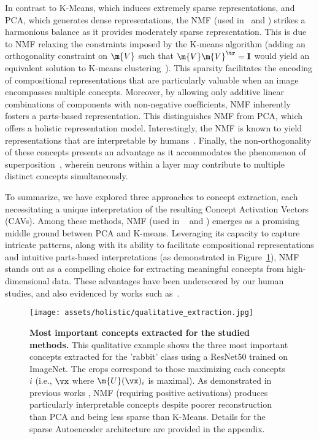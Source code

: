 In contrast to K-Means, which induces extremely sparse representations, and PCA, which generates dense representations, the NMF (used in \CRAFT~and \ICE) strikes a harmonious balance as it provides moderately sparse representation. This is due to NMF relaxing the constraints imposed by the K-means algorithm (adding an orthogonality constraint on $\m{V}$ such that $\m{V} \m{V}^\tr = \mathbf{I}$ would yield an equivalent solution to K-means clustering~\cite{ding2005equivalence}). This sparsity facilitates the encoding of compositional representations that are particularly valuable when an image encompasses multiple concepts. Moreover, by allowing only additive linear combinations of components with non-negative coefficients, %
NMF inherently fosters a parts-based representation. This distinguishes NMF from PCA, which offers a holistic representation model. Interestingly, the NMF is known to yield representations that are interpretable by humans~\cite{zhang2021invertible, fel2023craft}.
Finally, the non-orthogonality of these concepts presents an advantage as it accommodates the phenomenon of superposition~\cite{elhage2022superposition}, wherein neurons within a layer may contribute to multiple distinct concepts simultaneously.

To summarize, we have explored three approaches to concept extraction, each necessitating a unique interpretation of the resulting Concept Activation Vectors (CAVs). Among these methods, NMF (used in \CRAFT~ and \ICE) emerges as a promising middle ground between PCA and K-means. Leveraging its capacity to capture intricate patterns, along with its ability to facilitate compositional representations and intuitive parts-based interpretations (as demonstrated in Figure~\ref{fig:holistic:qualitative_comparison}), NMF stands out as a compelling choice for extracting meaningful concepts from high-dimensional data. These advantages have been underscored by our human studies, and also evidenced by works such as~\cite{zhang2021invertible}.



\begin{figure}[t]
\begin{center}
   \texttt{[image: assets/holistic/qualitative\_extraction.jpg]}
\end{center}
   \caption{\textbf{Most important concepts extracted for the studied methods.} This qualitative example shows the three most important concepts extracted for the 'rabbit' class using a ResNet50 trained on ImageNet. The crops correspond to those maximizing each concepts $i$ (i.e., $\vx$ where $\m{U}(\vx)_i$ is maximal). As demonstrated in previous works \cite{zhang2021invertible,fel2023craft,parekh2022listen}, NMF (requiring positive activations) produces particularly interpretable concepts despite poorer reconstruction than PCA and being less sparse than K-Means. Details for the sparse Autoencoder architecture are provided in the appendix.}
\label{fig:holistic:qualitative_comparison}
\end{figure}

